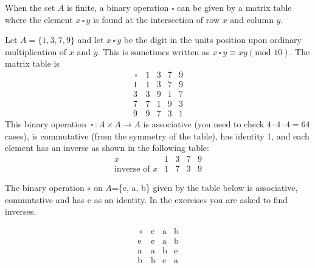 \documentclass[12pt]{book}
\theoremstyle{definition}
\begin{document}
When the set $A$ is finite, a binary operation $\square$ can be given by a matrix table where the element $x\,\square\, y$ is found at the intersection of row $x$ and column $y$.
\clearpage
\begin{tcexample}{}{}
Let $A=\{1,3,7,9\}$ and let $x\,\square\, y$ be the digit in the units position upon ordinary multiplication of $x$ and $y$.  This is sometimes written as $x\,\square\, y \equiv xy(\text{mod }10)$.  The matrix table is
$$\begin{array}{c|cccc}
\,\square\, & 1 & 3 & 7 & 9\\
\hline
1 & 1 & 3 & 7& 9\\
3 & 3 & 9 & 1& 7\\
7 & 7 & 1 & 9 & 3\\
9 & 9 & 7 & 3 & 1
\end{array}$$
This binary operation $\,\square\,:A\times A\rightarrow A$ is associative (you need to check $4\cdot4\cdot4=64$ cases), is commutative (from the symmetry of the table), has identity 1, and each element has an inverse as shown in the following table:
$$\begin{array}{c|cccc}
x & 1 & 3 & 7 & 9\\
\hline
\text{inverse of }x & 1 & 7 & 3 & 9
\end{array}$$%
\end{tcexample} 

\begin{tcexample}{}{}
	The binary operation $\circ$ on $A$=\{e, a, b\} given by the table below is associative, commutative and has e as an identity.  In the exercises you are asked to find inverses.\\
	\begin{minipage}{2in}
		$$\begin{array}{c|ccc}
		\,\circ\, & \text{e} &\text{a} & \text{b}\\
		\hline
		\text{e} & \text{e} & \text{a} & \text{b}\\
		\text{a} & \text{a} & \text{b} & \text{e}\\
		\text{b} & \text{b} & \text{e} & \text{a}
		\end{array}$$
	\end{minipage}

\end{tcexample}
\end{document}
